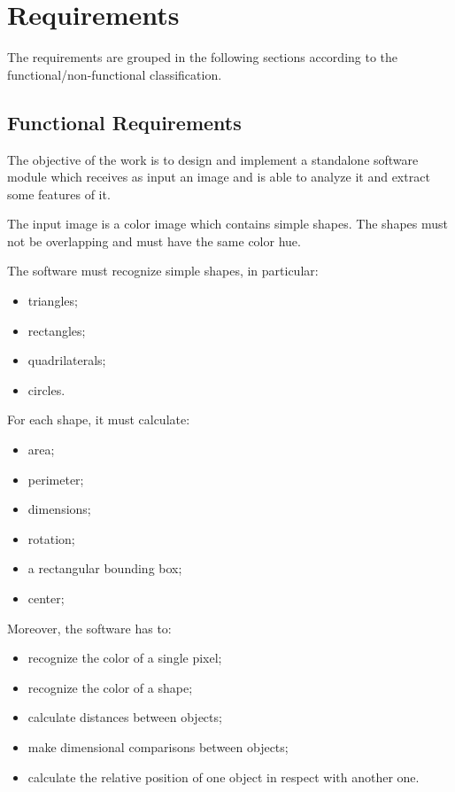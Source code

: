 	\section{Requirements}
	The requirements are grouped in the following sections according to the functional/non-functional classification. 

		\subsection{Functional Requirements}
		The objective of the work is to design and implement a standalone software module which receives as input an image and is able to analyze it and extract some features of it.

		The input image is a color image which contains simple shapes. The shapes must not be overlapping and must have the same color hue.

		The software must recognize simple shapes, in particular:
		\begin{itemize}
	    		\item triangles;
			\item rectangles;
			\item quadrilaterals;
			\item circles.
		\end{itemize}

		For each shape, it must calculate:
		\begin{itemize}
		    	\item area;
		    	\item perimeter;
			\item dimensions;
			\item rotation;
			\item a rectangular bounding box;
			\item center;
		\end{itemize}

		Moreover, the software has to:
		\begin{itemize}
			\item recognize the color of a single pixel;
			\item recognize the color of a shape;
		    	\item calculate distances between objects;			
			\item make dimensional comparisons between objects;
			\item calculate the relative position of one object in respect with another one.
		\end{itemize}

